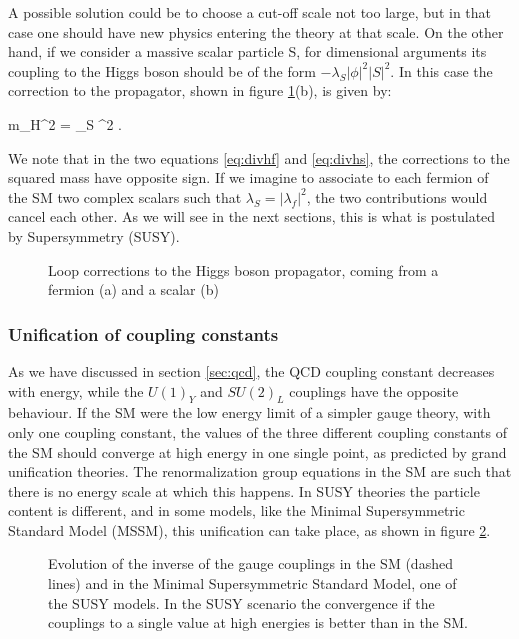 A possible solution could be to choose a cut-off scale not too large, but in that case one should have new physics entering the theory at that scale. On the other hand, if we consider a massive scalar particle S, for dimensional arguments its coupling to the Higgs boson should be of the form $ -\lambda_S
|\phi|^2 |S|^2$. In this case the correction to the propagator, shown in figure \ref{fig:hcorr}(b), is given by:
 
\beq
\Delta m_H^2 \>=\> {\lambda_S \pi^2}
.
\label{eq:divhs}
\eeq 
 
We note that in the two equations \ref{eq:divhf} and \ref{eq:divhs}, the corrections to the squared mass have opposite sign. If we imagine to associate to each fermion of the SM two complex scalars such that $\lambda_S = |\lambda_f|^2$, the two contributions would cancel each other. As we will see in the next sections, this is what is postulated by Supersymmetry (SUSY). 

\begin{figure}
\begin{center}
\end{center}
\caption[Loop corrections to the Higgs boson propagator]{Loop corrections to the Higgs boson propagator, coming from a fermion (a) and a scalar (b)}
\label{fig:hcorr}
\end{figure}

\subsubsection*{Unification of coupling constants}

As we have discussed in section \ref{sec:qcd}, the QCD coupling constant decreases with energy, while the $U(1)_Y$ and $SU(2)_L$ couplings have the opposite behaviour. If the SM were the low energy limit of a simpler gauge theory, with only one coupling constant, the values of the three different coupling constants of the SM should converge at high energy in one single point, as predicted by grand unification theories. The renormalization group equations in the SM are such that there is no energy scale at which this happens. In SUSY theories the particle content is different, and in some models, like the Minimal Supersymmetric Standard Model (MSSM), this unification can take place, as shown in figure \ref{fig:couplings}.

\begin{figure}
\begin{center}
\end{center}
\caption[Evolution of the coupling constants]{Evolution of the inverse of the gauge couplings in the SM (dashed lines) and in the Minimal Supersymmetric Standard Model, one of the SUSY models. In the SUSY scenario the convergence if the couplings to a single value at high energies is better than in the SM.}
\label{fig:couplings}
\end{figure}

